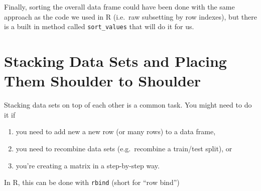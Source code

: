 \documentclass[
  12pt,
]{krantz}
\providecommand{\tightlist}{%
  \setlength{\itemsep}{0pt}\setlength{\parskip}{0pt}}
\begin{document}
Finally, sorting the overall data frame could have been done with the same approach as the code we used in R (i.e.~raw subsetting by row indexes), but there is a built in method called \texttt{sort\_values} that will do it for us.

\hypertarget{stacking-data-sets-and-placing-them-shoulder-to-shoulder}{%
\section{Stacking Data Sets and Placing Them Shoulder to Shoulder}\label{stacking-data-sets-and-placing-them-shoulder-to-shoulder}}

Stacking data sets on top of each other is a common task. You might need to do it if

\begin{enumerate}
\def\labelenumi{\arabic{enumi}.}
\tightlist
\item
  you need to add new a new row (or many rows) to a data frame,
\item
  you need to recombine data sets (e.g.~recombine a train/test split), or
\item
  you're creating a matrix in a step-by-step way.
\end{enumerate}

In R, this can be done with \texttt{rbind} (short for ``row bind'')
\end{document}
